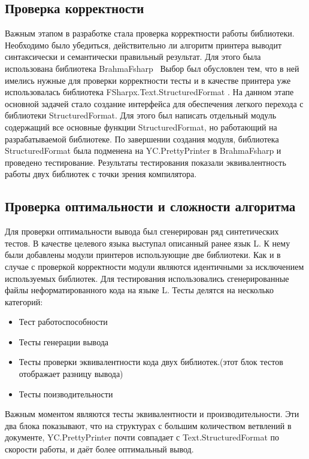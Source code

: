 \documentclass{matmex-diploma}
\begin{document}
\subsection{Проверка корректности}
Важным этапом в разработке стала проверка корректности работы библиотеки. Необходимо было убедиться, действительно ли алгоритм принтера выводит синтаксически и семантически правильный результат. Для этого была использована библиотека BrahmaFsharp~\cite{brahma} Выбор был обусловлен тем, что в ней имелись нужные для проверки корректности тесты и в качестве принтера уже использовалась библиотека FSharpx.Text.StructuredFormat . На данном этапе основной задачей стало создание интерфейса для обеспечения легкого перехода с библиотеки StructuredFormat. Для этого был написать отдельный модуль содержащий все основные функции StructuredFormat, но работающий на разрабатываемой библиотеке.
По завершении создания модуля, библиотека StructuredFormat была подменена на YC.PrettyPrinter в BrahmaFsharp и проведено тестирование. Результаты тестирования показали эквивалентность работы двух библиотек с точки зрения компилятора.
\subsection{Проверка оптимальности и сложности алгоритма}
Для проверки оптимальности вывода был сгенерирован ряд синтетических тестов. В качестве целевого языка выступал описанный ранее язык L. К нему были добавлены модули принтеров использующие две библиотеки. Как и в случае с проверкой корректности модули являются идентичными за исключением используемых библиотек. Для тестирования использовались сгенерированные файлы неформатированного кода на языке L. Тесты делятся на несколько категорий:
\begin{itemize}
    \item Тест работоспособности
    \item Тесты генерации вывода
    \item Тесты проверки эквивалентности кода двух библиотек.(этот блок тестов отображает разницу вывода)
    \item Тесты поизводительности
\end{itemize}
Важным моментом являются тесты эквивалентности и производительности. Эти два блока показывают, что на структурах с большим количеством ветвлений в документе, YC.PrettyPrinter почти совпадает с Text.StructuredFormat по скорости работы, и даёт более оптимальный вывод.
\end{document}
